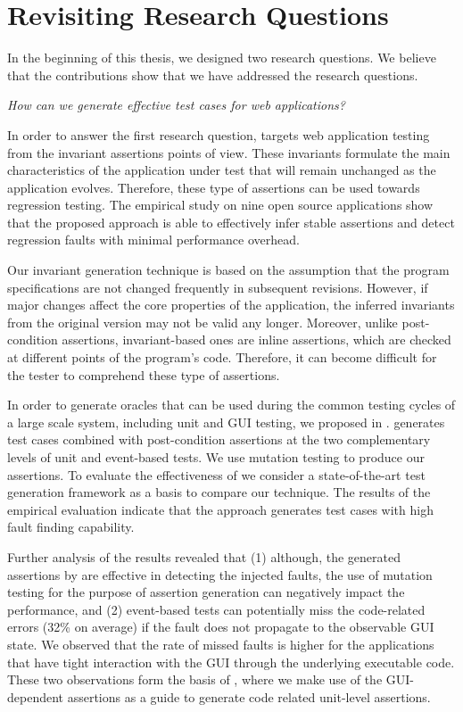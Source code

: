 \section{Revisiting Research Questions} 
In the beginning of this thesis, we designed two research questions. We believe that the contributions show that we have addressed the research questions.

\emph{How can we generate effective test cases for \javascript web applications?}

In order to answer the first research question,  targets web application testing from the invariant assertions points of view. These invariants formulate the main characteristics of the application under test that will remain unchanged as the application evolves. Therefore, these type of assertions can be used towards regression testing. The empirical study on nine open source \javascript applications show that the proposed approach is able to effectively infer stable assertions and 
detect regression faults with minimal performance overhead.

Our invariant generation technique is based on the assumption that the program specifications are not changed frequently in subsequent revisions. However, if major changes affect the core properties of the application, the inferred invariants from the original version may not be valid any longer. Moreover, unlike post-condition assertions, invariant-based ones are inline assertions, which are checked at different points of the program's code. Therefore, it can become difficult for the tester to comprehend these type of assertions.

In order to generate oracles that can be used during the common testing cycles of a large scale system, including unit and GUI testing, we proposed \jseft in . \jseft generates test cases combined with post-condition assertions at the two complementary levels of unit and event-based tests. We use mutation testing to produce our assertions. 
To evaluate the effectiveness of \jseft we consider a state-of-the-art \javascript test generation framework as a basis to compare our technique. The results of the empirical evaluation indicate that the approach generates test cases with high fault finding capability. 

Further analysis of the results revealed that (1) although, the generated assertions by \jseft are effective in detecting the injected faults, the use of mutation testing for the purpose of assertion generation can negatively impact the performance, and (2) event-based tests can potentially miss the code-related errors (32\% on average) if the fault does not propagate to the observable GUI state. We observed that the rate of missed faults is higher for the applications that have tight interaction with the GUI through the underlying executable code. These two observations form the basis of , where we make use of the GUI-dependent assertions as a guide to generate code related unit-level assertions.

